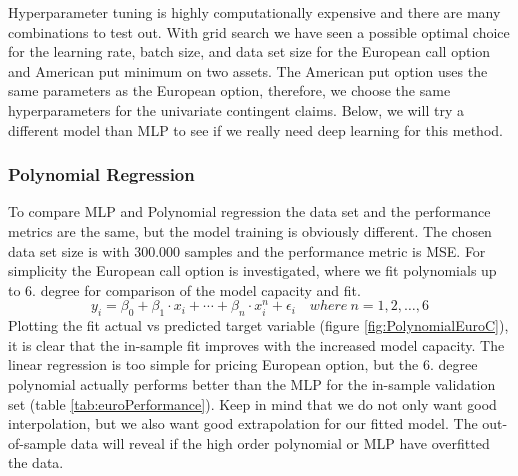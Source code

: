 Hyperparameter tuning is highly computationally expensive and there are many combinations to test out. With grid search we have seen a possible optimal choice for the learning rate, batch size, and data set size for the European call option and American put minimum on two assets. The American put option uses the same parameters as the European option, therefore,  we choose the same hyperparameters for the univariate contingent claims. Below, we will try a different model than MLP to see if we really need deep learning for this method. 

\subsubsection{Polynomial Regression}
To compare MLP and Polynomial regression the data set and the performance metrics are the same, but the model training is obviously different. The chosen data set size is with 300.000 samples and the performance metric is MSE. For simplicity the European call option is investigated, where we fit polynomials up to 6. degree for comparison of the model capacity and fit.  
$$y_i=\beta_0 + \beta_1 \cdot x_i + \cdots + \beta_n \cdot x_i^n + \epsilon_i \quad where \ n=1,2,\ldots,6$$
Plotting the fit actual vs predicted target variable (figure \ref{fig:PolynomialEuroC}), it is clear that the in-sample fit improves with the increased model capacity. The linear regression is too simple for pricing European option, but the 6. degree polynomial actually performs better than the MLP for the in-sample validation set (table \ref{tab:euroPerformance}). Keep in mind that we do not only want good interpolation, but we also want good extrapolation for our fitted model. The out-of-sample data will reveal if the high order polynomial or MLP have overfitted the data.\\

